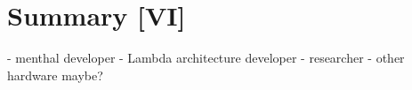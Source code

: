 \chapter{Summary [VI]}
\label{chap:summary}

- menthal developer
- Lambda architecture developer
- researcher
- other hardware maybe?